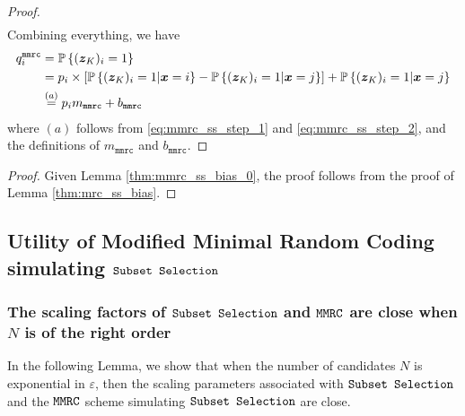 \begin{proof}
\begin{align}
\end{align}
Combining everything, we have
\begin{align}
    q^{\texttt{mmrc}}_i  & =   \mathbb{P}\left\{({\boldsymbol{z}}_K)_i  =   1\right\} \\
    & =   p_i \times \left[ \mathbb{P}\left\{ ({\boldsymbol{z}}_K)_i   =   1 \middle\vert {\boldsymbol{x}} = i\right\} - \mathbb{P}\left\{ ({\boldsymbol{z}}_K)_i   =   1 \middle\vert {\boldsymbol{x}} = j\right\} \right] + \mathbb{P}\left\{ ({\boldsymbol{z}}_K)_i   =   1 \middle\vert {\boldsymbol{x}} = j\right\}  \\
    & \stackrel{(a)}{=}   p_i  m_\texttt{mmrc} + b_\texttt{mmrc}
\end{align}
where $(a)$ follows from \eqref{eq:mmrc_ss_step_1} and \eqref{eq:mmrc_ss_step_2}, and the definitions of $m_\texttt{mmrc}$ and $b_\texttt{mmrc}$. 
\end{proof}

\mmrcssbias*
\begin{proof}
Given Lemma \ref{thm:mmrc_ss_bias_0}, the proof follows from the proof of Lemma \ref{thm:mrc_ss_bias}.
\end{proof}

 \subsection{Utility of Modified Minimal Random Coding simulating \texorpdfstring{$\texttt{Subset Selection}$}{Subset Selection}}\label{appendix:mmrc_ss_ut}
 
 \subsubsection{The scaling factors of \texorpdfstring{$\texttt{Subset Selection}$}{Subset Selection} and \texorpdfstring{$\texttt{MMRC}$}{MMRC} are close when \texorpdfstring{$N$}{N} is of the right order}\label{appendix:scaling_mmrc_ss}
 In the following Lemma, we show that when the number of candidates $N$ is exponential in $\varepsilon$, then the scaling parameters associated with $\texttt{Subset Selection}$ and the $\texttt{MMRC}$ scheme simulating $\texttt{Subset Selection}$ are close.
 
